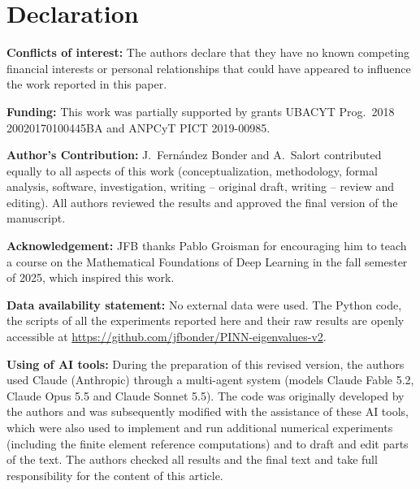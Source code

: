 \documentclass[10pt]{amsart}
\newenvironment{revblock}{\color{blue}}{}
\theoremstyle{definition}
\theoremstyle{remark}
\theoremstyle{plain}
\begin{document}
\section*{Declaration}
\begin{revblock}
\noindent\textbf{Conflicts of interest:} The authors declare that they have no known competing financial
interests or personal relationships that could have appeared to influence the work reported in this paper.

\noindent\textbf{Funding:} This work was partially supported by grants UBACYT Prog.\ 2018
20020170100445BA and ANPCyT PICT 2019-00985.

\noindent\textbf{Author's Contribution:} J.~Fern\'andez Bonder and A.~Salort contributed equally to all
aspects of this work (conceptualization, methodology, formal analysis, software, investigation,
writing -- original draft, writing -- review and editing). All authors reviewed the results and
approved the final version of the manuscript.

\noindent\textbf{Acknowledgement:} JFB thanks Pablo Groisman for encouraging him to teach a course on
the Mathematical Foundations of Deep Learning in the fall semester of 2025, which inspired this work.

\noindent\textbf{Data availability statement:} No external data were used. The Python code, the scripts
of all the experiments reported here and their raw results are openly accessible at
\url{https://github.com/jfbonder/PINN-eigenvalues-v2}.

\noindent\textbf{Using of AI tools:} During the preparation of this revised version, the authors used
Claude (Anthropic) through a multi-agent system (models Claude Fable 5.2, Claude Opus 5.5 and Claude
Sonnet 5.5). The code was originally developed by the authors and was subsequently modified with the
assistance of these AI tools, which were also used to implement and run additional numerical
experiments (including the finite element reference computations) and to draft and edit parts of the
text. The authors checked all results and the final text and take full responsibility for the content
of this article.
\end{revblock}
\end{document}
